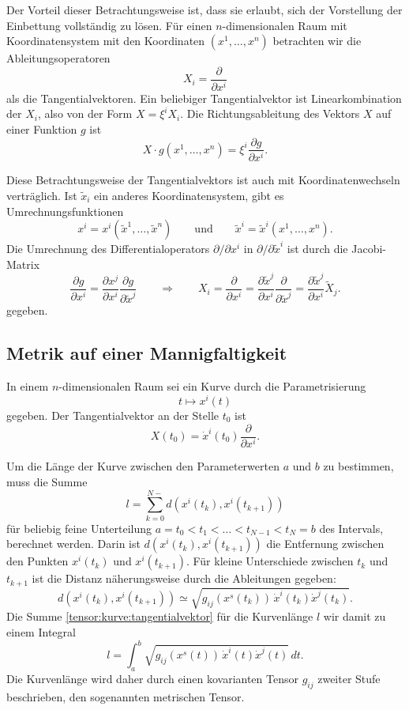 Der Vorteil dieser Betrachtungsweise ist, dass sie erlaubt, sich
der Vorstellung der Einbettung vollständig zu lösen.
Für einen $n$-dimensionalen Raum mit Koordinatensystem mit den Koordinaten
$(x^1,\dots,x^n)$ betrachten wir die Ableitungsoperatoren 
\[
X_i = \frac{\partial}{\partial x^i}
\]
als die Tangentialvektoren.
Ein beliebiger Tangentialvektor ist Linearkombination der $X_i$, also
von der Form $X = \xi^i X_i$.
Die Richtungsableitung des Vektors $X$ auf einer Funktion $g$ ist
\[
X\cdot g(x^1,\dots,x^n)
=
\xi^i \frac{\partial g}{\partial x^i}.
\]

Diese Betrachtungsweise der Tangentialvektors ist auch mit
Koordinatenwechseln verträglich.
Ist $\tilde x_i$ ein anderes Koordinatensystem, gibt es Umrechnungsfunktionen
\[
x^i
=
x^i(\tilde x^1,\dots,\tilde x^n)
\qquad
\text{und}
\qquad
\tilde x^i
=
\tilde x^i(x^1,\dots,x^n).
\]
Die Umrechnung des Differentialoperators $\partial/\partial x^i$ in 
$\partial/\partial\tilde x^i$ ist durch die Jacobi-Matrix 
\[
\frac{\partial g}{\partial x^i}
=
\frac{\partial x^j}{\partial x^i}
\frac{\partial g}{\partial\tilde x^j}
\qquad\Rightarrow\qquad
X_i
=
\frac{\partial}{\partial x^i}
=
\frac{\partial\tilde x^j}{\partial x^i}
\frac{\partial}{\partial\tilde x^j}
=
\frac{\partial\tilde x^j}{\partial x^i} \tilde X_j.
\]
gegeben.

\subsection{Metrik auf einer Mannigfaltigkeit}
In einem $n$-dimensionalen Raum sei ein Kurve durch die Parametrisierung
\[
t
\mapsto
x^i(t)
\]
gegeben.
Der Tangentialvektor an der Stelle $t_0$ ist
\begin{equation}
X(t_0)
=
\dot x^i(t_0)
\frac{\partial}{\partial x^i}.
\label{tensor:kurve:tangentialvektor}
\end{equation}

Um die Länge der Kurve zwischen den Parameterwerten $a$ und $b$ zu bestimmen,
muss die Summe
\[
l = \sum_{k=0}^{N-} d(x^i(t_k),x^i(t_{k+1}))
\]
für beliebig feine Unterteilung $a=t_0<t_1<\dots <t_{N-1}<t_N=b$ des Intervals,
berechnet werden.
Darin ist $d(x^i(t_k), x^i(t_{k+1}))$ die Entfernung zwischen den Punkten
$x^i(t_k)$ und $x^i(t_{k+1})$.
Für kleine Unterschiede zwischen $t_k$ und $t_{k+1}$ ist die Distanz
näherungsweise durch die Ableitungen gegeben:
\[
d(x^i(t_k), x^i(t_{k+1}))
\simeq
\sqrt{g_{ij}(x^s(t_k))\,\dot x^i(t_k) \dot x^j(t_k)}.
\]
Die Summe
\eqref{tensor:kurve:tangentialvektor}
für die Kurvenlänge $l$ wir damit zu einem Integral
\begin{equation}
l=\int_a^b \sqrt{g_{ij}(x^s(t))\, \dot x^i(t) \dot x^j(t)}\,dt.
\label{tensor:kurve:kurvenlaenge}
\end{equation}
Die Kurvenlänge wird daher durch einen kovarianten Tensor $g_{ij}$ 
zweiter Stufe beschrieben, den sogenannten metrischen Tensor.

